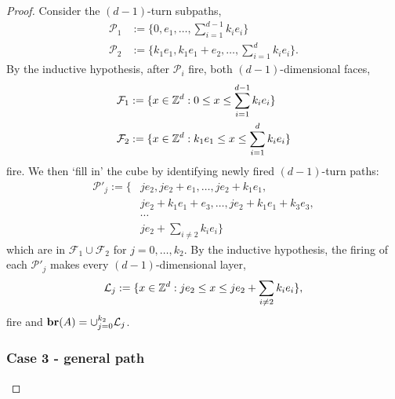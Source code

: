 \documentclass[12pt]{amsart}
\begin{document}
\begin{proof}
	
	Consider the $(d-1)$-turn subpaths, 
	\begin{equation}
	\begin{aligned}
	\mathcal{P}_1 &:= \{0, e_1, \ldots, \sum_{i=1}^{d-1} k_i e_i \} \\
	\mathcal{P}_2 &:= \{k_1 e_1, k_1 e_1 + e_2 , \ldots, \sum_{i=1}^{d} k_i e_i \}.
	\end{aligned}
	\end{equation}
	By the inductive hypothesis, after $\mathcal{P}_i$ fire,  
	both $(d-1)$-dimensional faces, 
	\begin{equation}
	\begin{aligned}
	\mathcal{F}_1 &:= \{x \in \mathbb{Z}^d : 0 \leq x \leq \sum_{i=1}^{d-1} k_i e_i \} \\
	\mathcal{F}_2 &:= \{x \in \mathbb{Z}^d : k_1 e_1 \leq x \leq \sum_{i=1}^{d} k_i e_i \}
	\end{aligned}
	\end{equation}
	fire. We then `fill in' the cube by identifying newly fired $(d-1)$-turn paths:
	\begin{equation}
	\begin{aligned}
	\mathcal{P}'_j := \{ & j  e_2, j e_2 + e_1, \ldots, j e_2 + k_1 e_1,  \\ 
	& j e_2 + k_1 e_1 + e_3, \ldots, j e_2 + k_1 e_1 + k_3 e_3, \\
	& \cdots \\
	&j e_2 + \sum_{i\not=2} k_i e_i \} 
	\end{aligned}
	\end{equation}
	which are in $\mathcal{F}_1 \cup \mathcal{F}_2$ for $j=0, \ldots, k_2$. By the inductive hypothesis, the firing of each $\mathcal{P}'_j$ makes every $(d-1)$-dimensional layer,
	\[
	\mathcal{L}_j := \{x \in \mathbb{Z}^d : j e_2 \leq x \leq j e_2 + \sum_{i\not=2} k_i e_i \},
	\]
	fire and $\mathbf{br}(A) = \cup_{j=0}^{k_2} \mathcal{L}_j$. 
	
	
	
	
	
	
	\subsubsection*{Case 3 - general path}
	

\end{proof}
\end{document}
